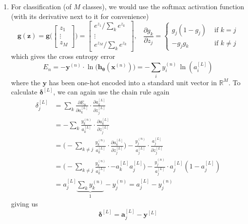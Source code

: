\begin{algo}[Backpropagation]
\begin{enumerate}
      \item For classification (of $M$ classes), we would use the softmax activation function (with its derivative next to it for convenience) 
      \begin{equation}
        \mathbf{g}(\mathbf{z}) = \mathbf{g} \bigg( \begin{bmatrix} z_1 \\ \vdots \\ z_M \end{bmatrix} \bigg) = \begin{bmatrix} e^{z_1} / \sum_k e^{z_k} \\ \vdots \\ e^{z_M} / \sum_k e^{z_k} \end{bmatrix}, \;\;\; \frac{\partial g_k}{\partial z_j} = \begin{cases} g_j (1 - g_j) & \text{ if } k = j \\ - g_j g_k & \text{ if } k \neq j \end{cases}
      \end{equation}
      which gives the cross entropy error 
      \begin{equation}
        E_n = - \mathbf{y}^{(n)} \cdot \ln \big( \mathbf{h}_{\boldsymbol{\theta}} (\mathbf{x}^{(n)}) \big) = -\sum_i y^{(n)}_i \, \ln(a_i^{[L]})
      \end{equation}
      where the $\mathbf{y}$ has been one-hot encoded into a standard unit vector in $\mathbb{R}^M$. To calculate $\boldsymbol{\delta}^{[L]}$, we can again use the chain rule again 
      \begin{align}
        \delta_j^{[L]} & = \sum_k \frac{\partial E_n}{\partial a_k^{[L]}} \cdot \frac{\partial a_k^{[L]}}{\partial z_j^{[L]}} \\
        & = - \sum_k \frac{y_k^{(n)}}{a_k^{{[L]}}} \cdot \frac{\partial a_k^{[L]}}{\partial z_j^{[L]}} \\
        & = \bigg( - \sum_{k \neq j} \frac{y_k^{(n)}}{a_k^{{[L]}}} \cdot \frac{\partial a_k^{[L]}}{\partial z_j^{[L]}} \bigg) - \frac{y_j^{(n)}}{a_j^{{[L]}}} \cdot \frac{a_j^{[L]}}{\partial z_j^{[L]}} \\ 
        & = \bigg( - \sum_{k \neq j} \frac{y_k^{(n)}}{a_k^{{[L]}}} \cdot - a_k^{[L]} a_j^{[L]} \bigg) - \frac{y_j^{(n)}}{a_j^{{[L]}}} \cdot a_j^{[L]} (1 - a_j^{[L]}) \\ 
        & = a_j^{[L]} \underbrace{\sum_{k} y_k^{(n)}}_{1} - y_j^{(n)} = a_j^{[L]} - y_j^{(n)}
      \end{align}
      giving us 
      \begin{equation}
        \boldsymbol{\delta}^{[L]} = \mathbf{a}_j^{[L]} - \mathbf{y}^{[L]}
      \end{equation}
    \end{enumerate}


\end{algo}

